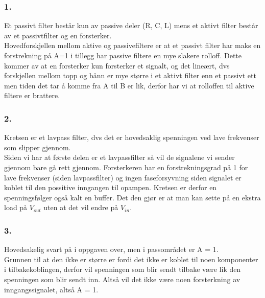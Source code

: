 \documentclass[a4paper, norsk, twoside, 10pt]{article}
\begin{document}
\subsubsection*{1.}
Et passivt filter består kun av passive deler (R, C, L) mens et aktivt filter består av et passivtfilter og en forsterker. \\
Hovedforskjellen mellom aktive og passivefiltere er at et passivt filter har maks en forstrekning på A=1 i tillegg har passive filtere en mye slakere rolloff. Dette kommer av at en forsterker kun forsterker et signalt, og det lineært, dvs forskjellen mellom topp og bånn er mye større i et aktivt filter enn et passivt ett men tiden det tar å komme fra A til B er lik, derfor har vi at rolloffen til aktive filtere er brattere.

\subsubsection*{2.}
Kretsen er et lavpass filter, dvs det er hovedsaklig spenningen ved lave frekvenser som slipper gjennom. \\
Siden vi har at første delen er et lavpassfilter så vil de signalene vi sender gjennom bare gå rett gjennom. Forsterkeren har en forstrekningsgrad på 1 for lave frekvenser (siden lavpassfilter) og ingen faseforsyvning siden signalet er koblet til den possitive inngangen til opampen. Kretsen er derfor en spenningsfølger også kalt en buffer. Det den gjør er at man kan sette på en ekstra load på $V_{out}$ uten at det vil endre på $V_{in}$.



\subsubsection*{3.}
Hovedsakelig svart på i oppgaven over, men i passområdet er A = 1. \\
Grunnen til at den ikke er større er fordi det ikke er koblet til noen komponenter i tilbakekoblingen, derfor vil spenningen som blir sendt tilbake være lik den spenningen som blir sendt inn. Altså vil det ikke være noen forsterkning av inngangssignalet, altså A = 1.
\end{document}
